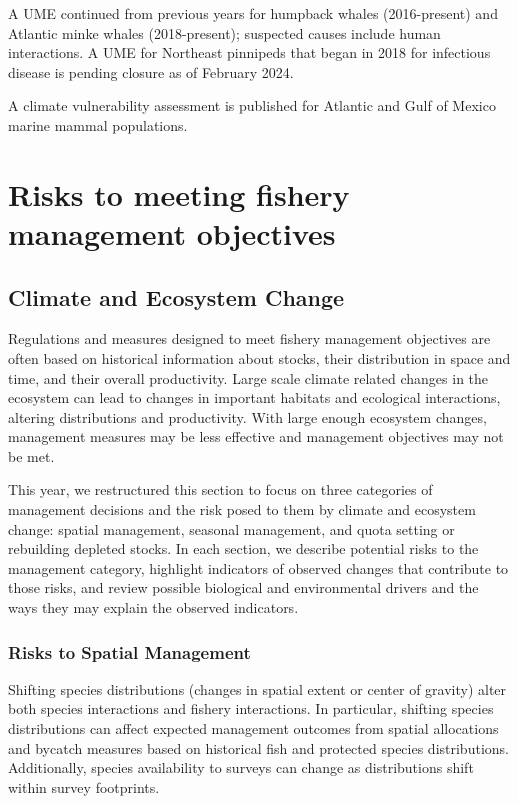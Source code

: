 \documentclass[
  10pt,
]{article}
\begin{document}
A UME continued from previous years for humpback whales (2016-present) and Atlantic minke whales (2018-present); suspected causes include human interactions. A UME for Northeast pinnipeds that began in 2018 for infectious disease is pending closure as of February 2024.

A climate vulnerability assessment is published for Atlantic and Gulf of Mexico marine mammal populations.

\hypertarget{climate-risks}{%
\section{Risks to meeting fishery management objectives}\label{climate-risks}}

\hypertarget{climate-and-ecosystem-change}{%
\subsection{Climate and Ecosystem Change}\label{climate-and-ecosystem-change}}

Regulations and measures designed to meet fishery management objectives are often based on historical information about stocks, their distribution in space and time, and their overall productivity. Large scale climate related changes in the ecosystem can lead to changes in important habitats and ecological interactions, altering distributions and productivity. With large enough ecosystem changes, management measures may be less effective and management objectives may not be met.

This year, we restructured this section to focus on three categories of management decisions and the risk posed to them by climate and ecosystem change: spatial management, seasonal management, and quota setting or rebuilding depleted stocks. In each section, we describe potential risks to the management category, highlight indicators of observed changes that contribute to those risks, and review possible biological and environmental drivers and the ways they may explain the observed indicators.

\hypertarget{risks-to-spatial-management}{%
\subsubsection{Risks to Spatial Management}\label{risks-to-spatial-management}}

Shifting species distributions (changes in spatial extent or center of gravity) alter both species interactions and fishery interactions. In particular, shifting species distributions can affect expected management outcomes from spatial allocations and bycatch measures based on historical fish and protected species distributions. Additionally, species availability to surveys can change as distributions shift within survey footprints.
\end{document}
